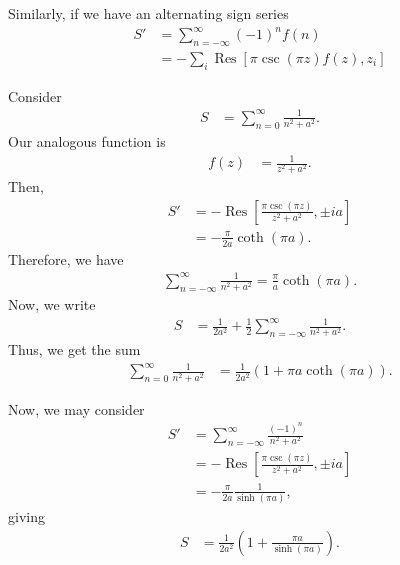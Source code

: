 \documentclass[10pt]{mypackage}
\DeclareMathOperator{\res}{Res}
\begin{document}
   Similarly, if we have an alternating sign series
   \begin{align*}
     S' &= \sum_{n=-\infty}^{\infty}\left( -1 \right)^{n}f(n)\\
        &= -\sum_{i}\res\left[ \pi\csc\left( \pi z \right)f(z),z_i \right]
   \end{align*}
   \begin{example}
     Consider
     \begin{align*}
       S &= \sum_{n=0}^{\infty}\frac{1}{n^2 + a^2}.
     \end{align*}
     Our analogous function is
     \begin{align*}
       f(z) &= \frac{1}{z^2 + a^2}.
     \end{align*}
     Then,
     \begin{align*}
       S' &= -\res\left[ \frac{\pi\csc\left( \pi z \right)}{z^2 + a^2} ,\pm ia\right]\\
         &= -\frac{\pi}{2a}\coth\left( \pi a \right).
     \end{align*}
     Therefore, we have
     \begin{align*}
       \sum_{n=-\infty}^{\infty} \frac{1}{n^2 + a^2} = \frac{\pi}{a}\coth\left( \pi a \right).
     \end{align*}
     Now, we write
     \begin{align*}
       S &= \frac{1}{2a^2} + \frac{1}{2}\sum_{n=-\infty}^{\infty}\frac{1}{n^2 + a^2}.
     \end{align*}
     Thus, we get the sum
     \begin{align*}
       \sum_{n=0}^{\infty}\frac{1}{n^2 + a^2} &= \frac{1}{2a^2}\left( 1 + \pi a \coth\left( \pi a \right) \right).
     \end{align*}
   \end{example}
   \begin{example}
     Now, we may consider
     \begin{align*}
       S' &= \sum_{n=-\infty}^{\infty}\frac{\left( -1 \right)^n}{n^2 + a^2}\\
         &= -\res\left[ \frac{\pi\csc\left( \pi z \right)}{z^2 + a^2},\pm ia \right]\\
         &= -\frac{\pi}{2a}\frac{1}{\sinh\left( \pi a \right)},
     \end{align*}
     giving
     \begin{align*}
       S &= \frac{1}{2a^2}\left( 1 + \frac{\pi a}{\sinh\left( \pi a \right)} \right).
     \end{align*}
     
   \end{example}
   
\end{document}
